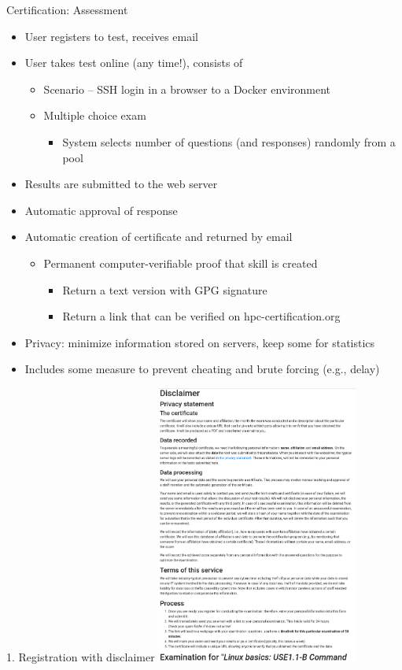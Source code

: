 \documentclass[compress,aspectratio=169]{beamer}
\begin{document}
\begin{frame}{Certification: Assessment}
		\begin{itemize}
      \item[\color{goettingenBlue}{1.}] User registers to test, receives email
			\item[\color{goettingenBlue}{2.}] User takes test online (any time!), consists of
			\begin{itemize}
        \item Scenario -- SSH login in a browser to a Docker environment
        \item Multiple choice exam
        \begin{itemize}
          \item System selects number of questions (and responses) randomly from a pool
        \end{itemize}
			\end{itemize}
			\item[\color{goettingenBlue}{3.}] Results are submitted to the web server
			\item[\color{goettingenBlue}{4.}] Automatic approval of response
			\item[\color{goettingenBlue}{5.}] Automatic creation of certificate and returned by email
			\begin{itemize}
							\item Permanent computer-verifiable proof that skill is created
							\begin{itemize}
								\item Return a text version with GPG signature
								\item Return a link that can be verified on hpc-certification.org
							\end{itemize}
			\end{itemize}
			\item Privacy: minimize information stored on servers, keep some for statistics
			\item Includes some measure to prevent cheating and brute forcing (e.g., delay)
		\end{itemize}
\end{frame}

\begin{frame}{1. Registration with disclaimer}
\includegraphics[width=0.5\textwidth]{disclaimer}
\end{frame}
\end{document}
